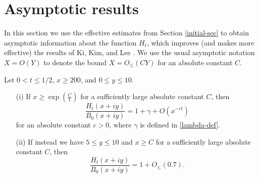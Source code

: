\section{Asymptotic results}

In this section we use the effective estimates from Section \ref{initial-sec} to obtain asymptotic information about the function $H_t$, which improves (and makes more effective) the results of Ki, Kim, and Lee \cite{kkl}. We use the usual asymptotic notation $X = O(Y)$ to denote the bound $X = O_{\leq}(CY)$ for an absolute constant $C$.

\begin{proposition}\label{asymp}  Let $0 < t \leq 1/2$, $x \geq 200$, and $0 \leq y \leq 10$.
\begin{itemize}
\item[(i)]  If $x \geq \exp(\frac{C}{t})$ for a sufficiently large absolute constant $C$, then
$$ \frac{H_t(x+iy)}{B_0(x+iy)} = 1 + \gamma + O( x^{-ct} )$$
for an absolute constant $c>0$, where $\gamma$ is defined in \eqref{lambda-def}.  
\item[(ii)]  If instead we have $5 \leq y \leq 10$ and $x \geq C$ for a sufficiently large absolute constant $C$, then
$$ \frac{H_t(x+iy)}{B_0(x+iy)} = 1 + O_{\leq}( 0.7 ).$$
\end{itemize}
\end{proposition}

